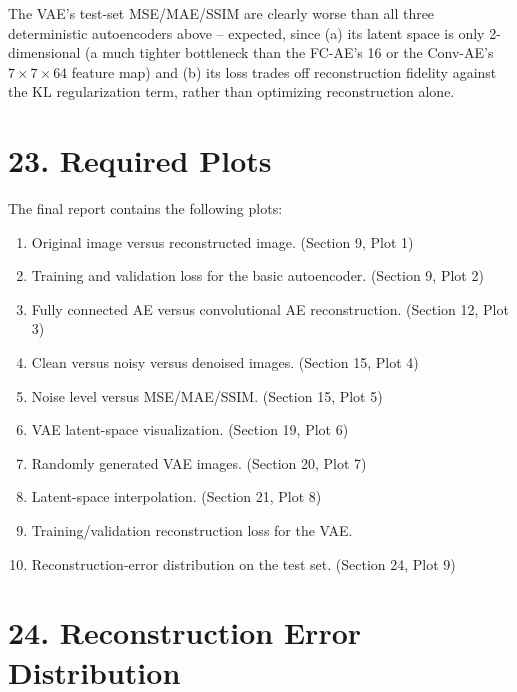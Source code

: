 \documentclass[10pt]{article}
\begin{document}
The VAE's test-set MSE/MAE/SSIM are clearly worse than all three
deterministic autoencoders above -- expected, since (a) its latent space is
only 2-dimensional (a much tighter bottleneck than the FC-AE's 16 or the
Conv-AE's $7\times7\times64$ feature map) and (b) its loss trades off
reconstruction fidelity against the KL regularization term, rather than
optimizing reconstruction alone.

\section*{23. Required Plots}

The final report contains the following plots:

\begin{enumerate}
\item Original image versus reconstructed image. (Section 9, Plot 1)
\item Training and validation loss for the basic autoencoder. (Section 9, Plot 2)
\item Fully connected AE versus convolutional AE reconstruction. (Section 12, Plot 3)
\item Clean versus noisy versus denoised images. (Section 15, Plot 4)
\item Noise level versus MSE/MAE/SSIM. (Section 15, Plot 5)
\item VAE latent-space visualization. (Section 19, Plot 6)
\item Randomly generated VAE images. (Section 20, Plot 7)
\item Latent-space interpolation. (Section 21, Plot 8)
\item Training/validation reconstruction loss for the VAE.
\item Reconstruction-error distribution on the test set. (Section 24, Plot 9)
\end{enumerate}


\section*{24. Reconstruction Error Distribution}
\end{document}
